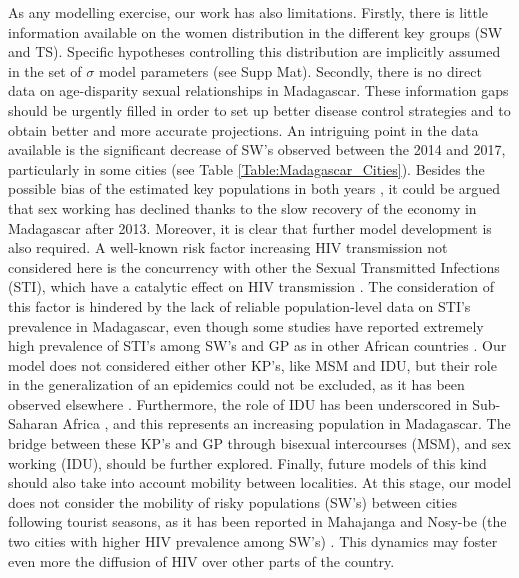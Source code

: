 \documentclass[preprint,12pt]{elsarticle}
\begin{document}
As any modelling exercise, our work has also limitations. Firstly, there is little information available on the women distribution in the different key groups (SW and TS). Specific hypotheses controlling this distribution are implicitly assumed in the set of $\sigma$ model parameters (see Supp Mat). Secondly, there is no direct data on age-disparity sexual relationships in Madagascar. These information gaps should be urgently filled in order to set up better disease control strategies and to obtain better and more accurate projections. An intriguing point in the data available is the significant decrease of SW's observed between the 2014 and 2017, particularly in some cities (see Table \ref{Table:Madagascar_Cities}). Besides the possible bias of the estimated key populations in both years \cite{Raberahona2020}, it could be argued that sex working has declined thanks to the slow recovery of the economy in Madagascar after 2013.  Moreover, it is clear that further model development is also required. A well-known risk factor increasing HIV transmission not considered here is the concurrency with other the Sexual Transmitted Infections (STI), which have a catalytic effect on HIV transmission \cite{Torrone2018}. The consideration of this factor is hindered by the lack of reliable population-level data on STI's prevalence in Madagascar, even though some studies have reported extremely high prevalence of STI's among SW's and GP \cite{Raberahona2020} as in other African countries \cite{Torrone2018}. Our model does not considered either other KP's, like MSM and IDU, but their role in the generalization of an epidemics could not be excluded, as it has been observed elsewhere \cite{Celentano1998}. Furthermore, the role of IDU has been underscored in Sub-Saharan Africa \cite{Asher2013}, and this represents an increasing population in Madagascar. The bridge between these KP’s and GP through bisexual intercourses (MSM), and sex working (IDU), should be further explored. Finally, future models of this kind should also take into account mobility between localities. At this stage, our model does not consider the mobility of risky populations (SW's) between cities following tourist seasons, as it has been reported in Mahajanga and Nosy-be (the two cities with higher HIV prevalence among SW's) \cite{Raberahona2020}. This dynamics may foster even more the diffusion of HIV over other parts of the country. 
\smallskip
\end{document}
